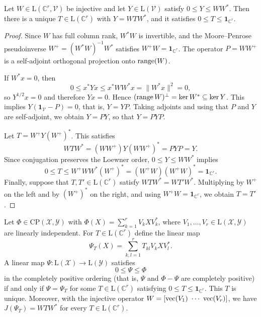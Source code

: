 \begin{lemma}\label{cont:lem:factor}
Let $W\in \mathrm{L}(\mathbb{C}^r,\mathcal{V})$ be injective and let $Y\in \mathrm{L}(\mathcal{V})$ satisfy $0\leq Y \leq WW^*$.
Then there is a unique $T\in \mathrm{L}(\mathbb{C}^r)$ with $Y=WTW^*$, and it satisfies $0\leq T\leq\mathbf{1}_{\mathbb{C}^r}$.
\end{lemma}
 
\begin{proof}
Since $W$ has full column rank, $W^*W$ is invertible, and the Moore--Penrose pseudoinverse $W^+=(W^*W)^{-1}W^*$ satisfies $W^+W=\mathbf{1}_{\mathbb{C}^r}$. The operator
$P=WW^+$ is a self-adjoint orthogonal projection onto $\operatorname{range}(W)$.
 
If $W^*x=0$, then
\[
0\leq x^*Yx\leq x^*WW^*x=\|W^*x\|^2=0,
\]
so $Y^{1/2}x=0$ and therefore $Yx=0$. Hence $(\operatorname{range} W)^\perp=\ker W^*\subseteq\ker Y$. This implies $Y(\mathbf{1}_{\mathcal{V}}-P)=0$, that is, $Y=YP$. Taking adjoints and using that $P$ and $Y$ are self-adjoint, we obtain $Y=PY$, so that $Y=PYP$.
 
Let $T=W^+Y(W^+)^*$. This satisfies
\[WTW^*=(WW^+)Y(WW^+)^*=PYP=Y.\]
Since conjugation preserves the Loewner order, $0\leq Y\leq WW^*$ implies
\[0\leq T\leq W^+WW^*(W^+)^*=(W^+W)(W^+W)^*=\mathbf{1}_{\mathbb{C}^r}.\]
Finally, suppose that $T,T'\in \mathrm{L}(\mathbb{C}^r)$ satisfy $WTW^*=WT'W^*$. Multiplying by $W^+$ on the left and by $(W^+)^*$ on the right, and using $W^+W=\mathbf{1}_{\mathbb{C}^r}$, we obtain $T=T'$.
\end{proof}
 
\begin{theorem}\label{cont:thm:arveson}
Let $\Phi\in\mathrm{CP}(\mathcal{X},\mathcal{Y})$ with $\Phi(X)=\sum_{k=1}^rV_kXV_k^*$, where $V_1,\dots,V_r\in \mathrm{L}(\mathcal{X},\mathcal{Y})$ are
linearly independent. For $T\in \mathrm{L}(\mathbb{C}^r)$ define the linear map
\[\Psi_T(X)=\sum_{k,l=1}^rT_{kl}V_kXV_l^*.\]
A linear map $\Psi:\mathrm{L}(\mathcal{X})\to \mathrm{L}(\mathcal{Y})$ satisfies 
\[0\leq \Psi\leq \Phi\] in the completely positive ordering (that is, $\Psi$ and $\Phi-\Psi$ are completely positive) if and only if $\Psi=\Psi_T$ for some $T\in \mathrm{L}(\mathbb{C}^r)$ satisfying $0\leq T\leq\mathbf{1}_{\mathbb{C}^r}$. This $T$ is unique. Moreover, with the injective operator $W=[\vectorise(V_1)\ \cdots\ \vectorise(V_r)]$, we have $J(\Psi_T)=WTW^*$ for every $T\in\mathrm{L}(\mathbb{C}^r)$.
\end{theorem}
 
